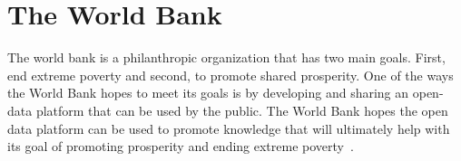 \section{The World Bank}

The world bank is a philanthropic organization that has two main goals.  First,
end extreme poverty and second, to promote shared prosperity.  One of the ways
the World Bank hopes to meet its goals is by developing and sharing an
open-data platform that can be used by the public.  The World Bank hopes the
open data platform can be used to promote knowledge that will ultimately help
with its goal of promoting prosperity and ending extreme poverty~\cite{hid-sp18-505-Bank2018}.
